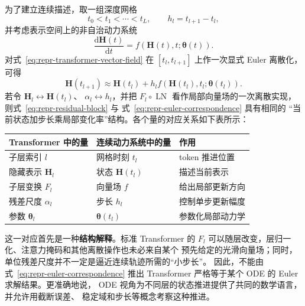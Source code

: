 \documentclass[UTF8,a4paper,zihao=-4,oneside,openany]{ctexbook}
\begin{document}
为了建立连续描述，取一组深度网格
\[
    t_0<t_1<\cdots<t_L,
    \qquad
    h_l=t_{l+1}-t_l,
\]
并考虑表示空间上的非自治动力系统
\begin{equation}
    \frac{\mathrm{d}\boldsymbol{H}(t)}{\mathrm{d}t}
    =
    f\!\left(
        \boldsymbol{H}(t),t;
        \boldsymbol{\theta}(t)
    \right).
    \label{eq:repr-transformer-vector-field}
\end{equation}
对式~\eqref{eq:repr-transformer-vector-field} 在
\([t_l,t_{l+1}]\) 上作一次显式 Euler 离散化，可得
\begin{equation}
    \boldsymbol{H}(t_{l+1})
    \approx
    \boldsymbol{H}(t_l)
    +
    h_l
    f\!\left(
        \boldsymbol{H}(t_l),t_l;
        \boldsymbol{\theta}(t_l)
    \right).
    \label{eq:repr-euler-correspondence}
\end{equation}
若令
\(\boldsymbol{H}_{l}\leftrightarrow\boldsymbol{H}(t_l)\)、
\(\alpha_l\leftrightarrow h_l\)，并把
\(F_l\circ\operatorname{LN}\) 看作局部向量场的一次离散实现，
则式~\eqref{eq:repr-residual-block} 与
式~\eqref{eq:repr-euler-correspondence} 具有相同的
“当前状态加步长乘局部变化率”结构。各个量的对应关系如下表所示：
\begin{center}
\begin{tabular}{lll}
    \toprule
    Transformer 中的量 & 连续动力系统中的量 & 作用 \\
    \midrule
    子层索引 \(l\) & 网格时刻 \(t_l\) & token 推进位置 \\
    隐藏表示 \(\boldsymbol{H}_l\) & 状态 \(\boldsymbol{H}(t_l)\) & 描述当前表示 \\
    子层变换 \(F_l\) & 向量场 \(f\) & 给出局部更新方向 \\
    残差尺度 \(\alpha_l\) & 步长 \(h_l\) & 控制单步更新幅度 \\
    参数 \(\boldsymbol{\theta}_l\) & \(\boldsymbol{\theta}(t_l)\) & 参数化局部动力学 \\
    \bottomrule
\end{tabular}
\end{center}

这一对应首先是一种\textbf{结构解释}。标准 Transformer 的
\(F_l\) 可以随层改变，层归一化、注意力掩码和其他离散操作也未必来自某个
预先给定的光滑向量场；同时，单位残差尺度并不一定是逼近连续轨迹所需的“小步长”。
因此，不能由式~\eqref{eq:repr-euler-correspondence} 推出
Transformer 严格等于某个 ODE 的 Euler 求解结果。更准确地说，
ODE 视角为不同层的状态推进提供了共同的数学语言，并允许用截断误差、
稳定域和步长等概念考察这种推进。
\end{document}
